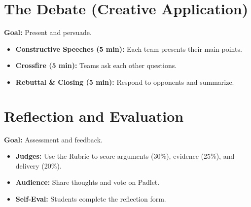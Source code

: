 \documentclass[11pt, a4paper]{article}
\begin{document}
\section{The Debate (Creative Application)}
\textbf{Goal:} Present and persuade.
\begin{itemize}
    \item \textbf{Constructive Speeches (5 min):} Each team presents their main points.
    \item \textbf{Crossfire (5 min):} Teams ask each other questions.
    \item \textbf{Rebuttal \& Closing (5 min):} Respond to opponents and summarize.
\end{itemize}

\section{Reflection and Evaluation}
\textbf{Goal:} Assessment and feedback.
\begin{itemize}
    \item \textbf{Judges:} Use the Rubric to score arguments (30\%), evidence (25\%), and delivery (20\%).
    \item \textbf{Audience:} Share thoughts and vote on Padlet.
    \item \textbf{Self-Eval:} Students complete the reflection form.
\end{itemize}
\end{document}
